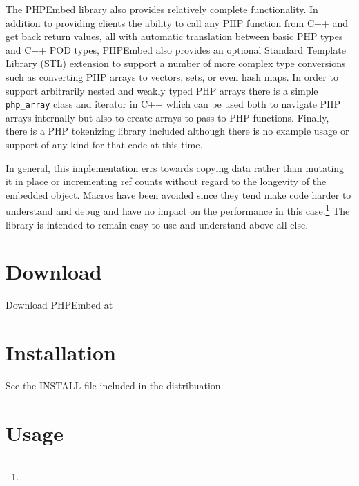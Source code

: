 \documentclass[11pt,titlepage]{article}
\begin{document}
The PHPEmbed library also provides relatively complete functionality. In addition to providing clients the ability to call any PHP function from C++ and get back return values, all with automatic translation between basic PHP types and C++ POD types, PHPEmbed also provides an optional Standard Template Library (STL) extension to support a number of more complex type conversions such as converting PHP arrays to vectors, sets, or even hash maps. In order to support arbitrarily nested and weakly typed PHP arrays there is a simple \verb|php_array| class and iterator in C++ which can be used both to navigate PHP arrays internally but also to create arrays to pass to PHP functions. Finally, there is a PHP tokenizing library included although there is no example usage or support of any kind for that code at this time.

In general, this implementation errs towards copying data rather than mutating it in place or incrementing ref counts without regard to the longevity of the embedded object. Macros have been avoided since they tend make code harder to understand and debug and have no impact on the performance in this case.\footnote{} The library is intended to remain easy to use and understand above all else.

\section{Download}

Download PHPEmbed at 

\section{Installation}

See the INSTALL file included in the distribuation.

\section{Usage}
\end{document}
